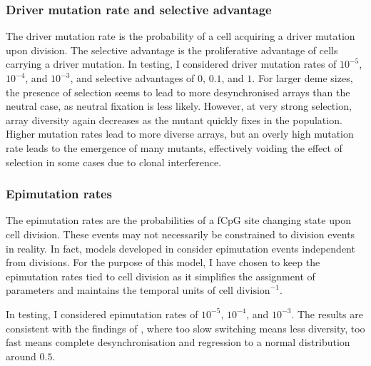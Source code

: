 \subsubsection{Driver mutation rate and selective advantage}
The driver mutation rate is the probability of a cell acquiring a driver
mutation upon division. The selective advantage is the proliferative advantage
of cells carrying a driver mutation. In testing, I considered driver mutation
rates of $10^{-5}$, $10^{-4}$, and $10^{-3}$, and selective advantages of $0$,
$0.1$, and $1$. For larger deme sizes, the presence of selection seems to lead
to more desynchronised arrays than the neutral case, as neutral fixation is
less likely. However, at very strong selection, array diversity again decreases
as the mutant quickly fixes in the population. Higher mutation rates lead to
more diverse arrays, but an overly high mutation rate leads to the emergence of
many mutants, effectively voiding the effect of selection in some cases due to
clonal interference.

\subsubsection{Epimutation rates}
The epimutation rates are the probabilities of a fCpG site changing state upon
cell division. These events may not necessarily be constrained to division
events in reality. In fact, models developed in \cite{gabbutt_fluctuating_2022,
gabbutt_evolutionary_2023} consider epimutation events independent from
divisions. For the purpose of this model, I have chosen to keep the epimutation
rates tied to cell division as it simplifies the assignment of parameters and
maintains the temporal units of $\text{cell division}^{-1}$. \par
In testing, I considered epimutation rates of $10^{-5}$, $10^{-4}$, and
$10^{-3}$. The results are consistent with the findings of
\cite{gabbutt_fluctuating_2022}, where too slow switching means less diversity,
too fast means complete desynchronisation and regression to a normal
distribution around $0.5$.

